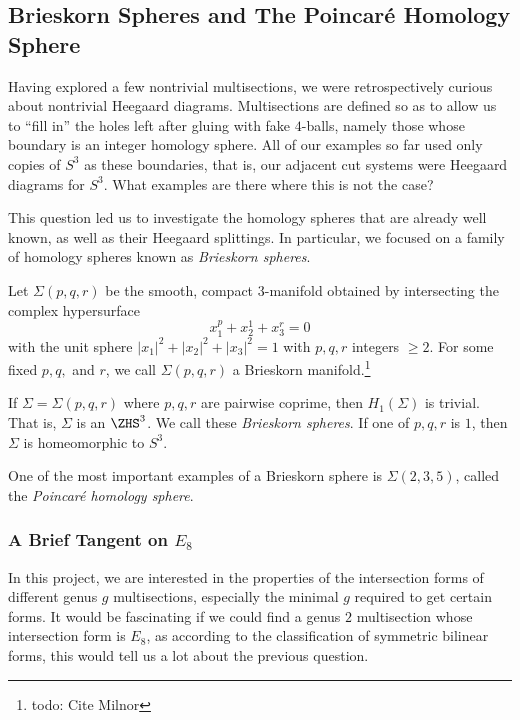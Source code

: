 \subsection{Brieskorn Spheres and The Poincar\'e Homology Sphere}

Having explored a few nontrivial multisections, we were retrospectively curious about nontrivial Heegaard diagrams. Multisections are defined so as to allow us to ``fill in'' the holes left after gluing with fake $4$-balls, namely those whose boundary is an integer homology sphere. All of our examples so far used only copies of $S^3$ as these boundaries, that is, our adjacent cut systems were Heegaard diagrams for $S^3$. What examples are there where this is not the case?

This question led us to investigate the homology spheres that are already well known, as well as their Heegaard splittings. In particular, we focused on a family of homology spheres known as \textit{Brieskorn spheres}.

\begin{definition}
	Let $\Sigma(p,q,r)$ be the smooth, compact $3$-manifold obtained by intersecting the complex hypersurface \[x_1^p + x_2^1 + x_3^r = 0\] with the unit sphere $|x_1|^2 + |x_2|^2 + |x_3|^2 = 1$ with $p,q,r$ integers $\geq 2$. For some fixed $p,q,$ and $r$, we call $\Sigma(p,q,r)$ a Brieskorn manifold.\footnote{todo: Cite Milnor}
\end{definition}

\begin{theorem}
	If $\Sigma = \Sigma(p,q,r)$ where $p,q,r$ are pairwise coprime, then $H_1(\Sigma)$ is trivial. That is, $\Sigma$ is an $\ZHS^3$. We call these \textit{Brieskorn spheres}. If one of $p,q,r$ is $1$, then $\Sigma$ is homeomorphic to $S^3$.
\end{theorem}

\begin{example}
	One of the most important examples of a Brieskorn sphere is $\Sigma(2,3,5)$, called the \textit{Poincar\'e homology sphere}. 
\end{example}

\subsubsection*{A Brief Tangent on $E_8$}
In this project, we are interested in the properties of the intersection forms of different genus $g$ multisections, especially the minimal $g$ required to get certain forms. It would be fascinating if we could find a genus $2$ multisection whose intersection form is $E_8$, as according to the classification of symmetric bilinear forms, this would tell us a lot about the previous question.

